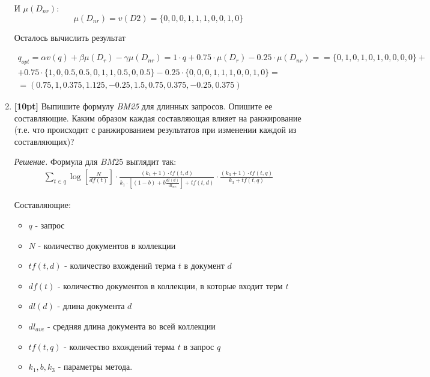 \begin{enumerate}
	И $\mu(D_{nr})$:
	\begin{equation*}
	\mu(D_{nr}) = v(D2) = \{0, 0, 0, 1, 1, 1, 0, 0, 1, 0\}
	\end{equation*}
	
	Осталось вычислить результат
	
	\begin{align*}
		q_{opt} = \alpha v(q) + \beta \mu(D_r) - \gamma \mu(D_{nr}) = 1 \cdot q + 0.75 \cdot 
		\mu(D_r) - 0.25 \cdot \mu(D_{nr}) = 
		= \{0, 1, 0, 1, 0, 1, 0, 0, 0, 0\} + \\ + 0.75 \cdot \{1, 0, 0.5, 0.5, 0, 1, 1, 0.5, 
		0, 0.5\} - 0.25 \cdot \{0, 0, 0, 1, 1, 1, 0, 0, 1, 0\} = \\ = (0.75, 1, 0.375, 
		1.125, -0.25, 1.5, 0.75, 0.375, -0.25, 0.375)
	\end{align*}

	\item \textbf{[10pt]} Выпишите формулу \textit{BM25} для длинных запросов. Опишите ее 
	составляющие. Каким образом каждая составляющая влияет на ранжирование (т.е. что происходит	с 
	ранжированием результатов при изменении каждой из составляющих)?

	\textit{Решение. } Формула для $BM25$ выглядит так:
	\begin{align*}
	\sum\limits_{t \in q} \log \left[ \frac{N}{df(t)} \right] \cdot \frac{(k_1 + 1) \cdot 
		tf(t, d)}{k_1\cdot \left[ (1 - b) + b \frac{dl(d)}{dl_{ave}} \right] + tf(t, d)} 
	\cdot \frac{(k_3 + 1) \cdot tf(t, q)}{k_3 + tf(t, q)}
	\end{align*}
	
	Составляющие:
	\begin{itemize}
		\item $q$ - запрос
		\item $N$ - количество документов в коллекции
		\item $tf(t, d)$ - количество вхождений терма $t$ в документ $d$
		\item $df(t)$ - количество документов в коллекции, в которые входит терм $t$
		\item $dl(d)$ - длина документа $d$
		\item $dl_{ave}$ - средняя длина документа во всей коллекции
		\item $tf(t, q)$ - количество вхождений терма $t$ в запрос $q$
		\item $k_1, b, k_3$ - параметры метода. 
	\end{itemize}
	

\end{enumerate}
